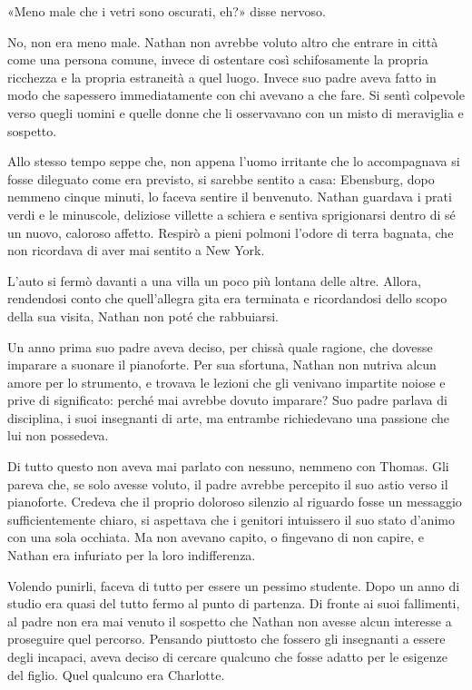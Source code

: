 \documentclass[a4paper,oneside,9pt]{memoir}
\begin{document}
«Meno male che i vetri sono oscurati, eh?» disse nervoso.

No, non era meno male. Nathan non avrebbe voluto altro che entrare in città come una persona comune, invece di
ostentare così schifosamente la propria ricchezza e la propria estraneità a quel luogo. Invece suo padre aveva fatto
in modo che sapessero immediatamente con chi avevano a che fare. Si sentì colpevole verso quegli uomini e quelle donne
che li osservavano con un misto di meraviglia e sospetto.

Allo stesso tempo seppe che, non appena l'uomo irritante che lo accompagnava si fosse dileguato come era previsto, si
sarebbe sentito a casa: Ebensburg, dopo nemmeno cinque minuti, lo faceva sentire il benvenuto. Nathan guardava i prati
verdi e le minuscole, deliziose villette a schiera e sentiva sprigionarsi dentro di sé un nuovo, caloroso affetto.
Respirò a pieni polmoni l'odore di terra bagnata, che non ricordava di aver mai sentito a New York.

L'auto si fermò davanti a una villa un poco più lontana delle altre. Allora, rendendosi conto che quell'allegra gita
era terminata e ricordandosi dello scopo della sua visita, Nathan non poté che rabbuiarsi.

Un anno prima suo padre aveva deciso, per chissà quale ragione, che dovesse imparare a suonare il pianoforte. Per sua
sfortuna, Nathan non nutriva alcun amore per lo strumento, e trovava le lezioni che gli venivano impartite noiose e
prive di significato: perché mai avrebbe dovuto imparare? Suo padre parlava di disciplina, i suoi insegnanti di arte,
ma entrambe richiedevano una passione che lui non possedeva.

Di tutto questo non aveva mai parlato con nessuno, nemmeno con Thomas. Gli pareva che, se solo avesse voluto, il padre
avrebbe percepito il suo astio verso il pianoforte. Credeva che il proprio doloroso silenzio al riguardo fosse un
messaggio sufficientemente chiaro, si aspettava che i genitori intuissero il suo stato d'animo con una sola occhiata. Ma
non avevano capito, o fingevano di non capire, e Nathan era infuriato per la loro indifferenza.

Volendo punirli, faceva di tutto per essere un pessimo studente. Dopo un anno di studio era quasi del tutto fermo al
punto di partenza. Di fronte ai suoi fallimenti, al padre non era mai venuto il sospetto che Nathan non avesse alcun
interesse a proseguire quel percorso. Pensando piuttosto che fossero gli insegnanti a essere degli incapaci, aveva
deciso di cercare qualcuno che fosse adatto per le esigenze del figlio. Quel qualcuno era Charlotte.
\end{document}
